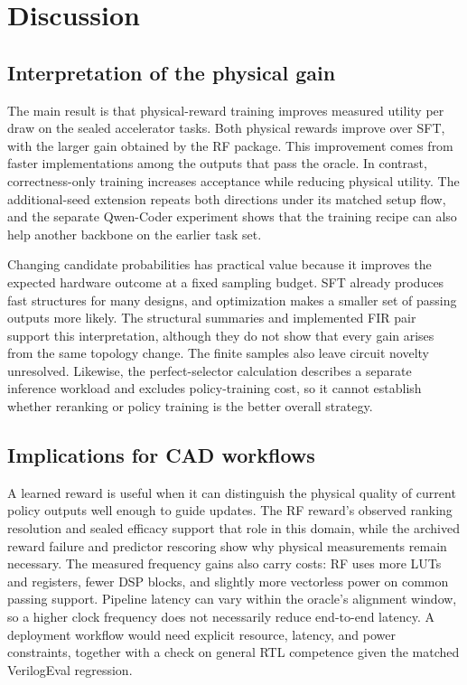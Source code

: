 \section{Discussion}
\label{sec:discussion}
\subsection{Interpretation of the physical gain}

The main result is that physical-reward training improves measured utility
per draw on the sealed accelerator tasks. Both physical rewards improve over
SFT, with the larger gain obtained by the RF package. This improvement comes
from faster implementations among the outputs that pass the oracle. In
contrast, correctness-only training increases acceptance while reducing
physical utility. The additional-seed extension repeats both directions under
its matched setup flow, and the separate Qwen-Coder experiment shows that the
training recipe can also help another backbone on the earlier task set.

Changing candidate probabilities has practical value because it improves the
expected hardware outcome at a fixed sampling budget. SFT already produces
fast structures for many designs, and optimization makes a smaller set of
passing outputs more likely. The structural summaries and implemented FIR
pair support this interpretation, although they do not show that every gain
arises from the same topology change. The finite samples also leave circuit
novelty unresolved. Likewise, the perfect-selector calculation describes a
separate inference workload and excludes policy-training cost, so it cannot
establish whether reranking or policy training is the better overall strategy.

\subsection{Implications for CAD workflows}

A learned reward is useful when it can distinguish the physical quality of
current policy outputs well enough to guide updates. The RF reward's observed
ranking resolution and sealed efficacy support that role in this domain,
while the archived reward failure and predictor rescoring show why physical
measurements remain necessary. The measured frequency gains also carry costs:
RF uses more LUTs and registers, fewer DSP blocks, and slightly more vectorless
power on common passing support. Pipeline latency can vary within the oracle's
alignment window, so a higher clock frequency does not necessarily reduce
end-to-end latency. A deployment workflow would need explicit resource,
latency, and power constraints, together with a check on general RTL competence
given the matched VerilogEval regression.

